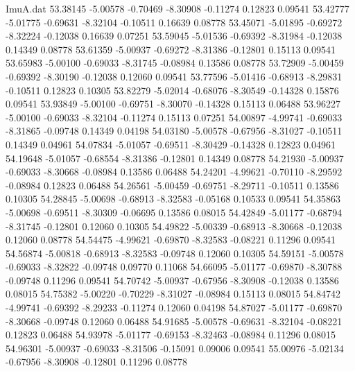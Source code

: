 \begin{filecontents}{ImuA.dat}
  53.38145   -5.00578   -0.70469   -8.30908   -0.11274    0.12823    0.09541
  53.42777   -5.01775   -0.69631   -8.32104   -0.10511    0.16639    0.08778
  53.45071   -5.01895   -0.69272   -8.32224   -0.12038    0.16639    0.07251
  53.59045   -5.01536   -0.69392   -8.31984   -0.12038    0.14349    0.08778
  53.61359   -5.00937   -0.69272   -8.31386   -0.12801    0.15113    0.09541
  53.65983   -5.00100   -0.69033   -8.31745   -0.08984    0.13586    0.08778
  53.72909   -5.00459   -0.69392   -8.30190   -0.12038    0.12060    0.09541
  53.77596   -5.01416   -0.68913   -8.29831   -0.10511    0.12823    0.10305
  53.82279   -5.02014   -0.68076   -8.30549   -0.14328    0.15876    0.09541
  53.93849   -5.00100   -0.69751   -8.30070   -0.14328    0.15113    0.06488
  53.96227   -5.00100   -0.69033   -8.32104   -0.11274    0.15113    0.07251
  54.00897   -4.99741   -0.69033   -8.31865   -0.09748    0.14349    0.04198
  54.03180   -5.00578   -0.67956   -8.31027   -0.10511    0.14349    0.04961
  54.07834   -5.01057   -0.69511   -8.30429   -0.14328    0.12823    0.04961
  54.19648   -5.01057   -0.68554   -8.31386   -0.12801    0.14349    0.08778
  54.21930   -5.00937   -0.69033   -8.30668   -0.08984    0.13586    0.06488
  54.24201   -4.99621   -0.70110   -8.29592   -0.08984    0.12823    0.06488
  54.26561   -5.00459   -0.69751   -8.29711   -0.10511    0.13586    0.10305
  54.28845   -5.00698   -0.68913   -8.32583   -0.05168    0.10533    0.09541
  54.35863   -5.00698   -0.69511   -8.30309   -0.06695    0.13586    0.08015
  54.42849   -5.01177   -0.68794   -8.31745   -0.12801    0.12060    0.10305
  54.49822   -5.00339   -0.68913   -8.30668   -0.12038    0.12060    0.08778
  54.54475   -4.99621   -0.69870   -8.32583   -0.08221    0.11296    0.09541
  54.56874   -5.00818   -0.68913   -8.32583   -0.09748    0.12060    0.10305
  54.59151   -5.00578   -0.69033   -8.32822   -0.09748    0.09770    0.11068
  54.66095   -5.01177   -0.69870   -8.30788   -0.09748    0.11296    0.09541
  54.70742   -5.00937   -0.67956   -8.30908   -0.12038    0.13586    0.08015
  54.75382   -5.00220   -0.70229   -8.31027   -0.08984    0.15113    0.08015
  54.84742   -4.99741   -0.69392   -8.29233   -0.11274    0.12060    0.04198
  54.87027   -5.01177   -0.69870   -8.30668   -0.09748    0.12060    0.06488
  54.91685   -5.00578   -0.69631   -8.32104   -0.08221    0.12823    0.06488
  54.93978   -5.01177   -0.69153   -8.32463   -0.08984    0.11296    0.08015
  54.96301   -5.00937   -0.69033   -8.31506   -0.15091    0.09006    0.09541
  55.00976   -5.02134   -0.67956   -8.30908   -0.12801    0.11296    0.08778

\end{filecontents}
